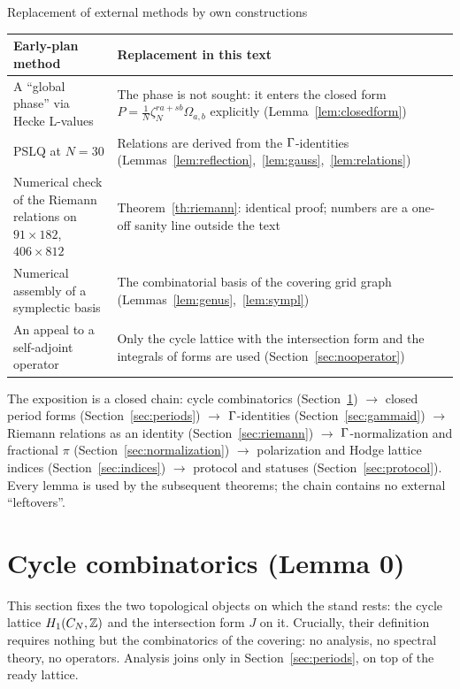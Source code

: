 \begin{keybox}{Replacement of external methods by own constructions}
\begin{center}
\small
\begin{tabularx}{\textwidth}{@{}>{\raggedright\arraybackslash}p{} >{\raggedright\arraybackslash}X@{}}
\toprule
\textbf{Early-plan method} & \textbf{Replacement in this text} \\
\midrule
A ``global phase'' via Hecke L-values &
The phase is not sought: it enters the closed form
$P=\tfrac1N\zeta_N^{ra+sb}\Omega_{a,b}$ explicitly
(Lemma~\ref{lem:closedform}) \\
PSLQ at $N=30$ &
Relations are derived from the $\Gamma$-identities
(Lemmas~\ref{lem:reflection},~\ref{lem:gauss},~\ref{lem:relations}) \\
Numerical check of the Riemann relations on $91\times182$,
$406\times812$ &
Theorem~\ref{th:riemann}: identical proof; numbers are a one-off
sanity line outside the text \\
Numerical assembly of a symplectic basis &
The combinatorial basis of the covering grid graph
(Lemmas~\ref{lem:genus},~\ref{lem:sympl}) \\
An appeal to a self-adjoint operator &
Only the cycle lattice with the intersection form and the integrals
of forms are used (Section~\ref{sec:nooperator}) \\
\bottomrule
\end{tabularx}
\end{center}
\end{keybox}

The exposition is a closed chain: cycle combinatorics
(Section~\ref{sec:cycles}) $\to$ closed period forms
(Section~\ref{sec:periods}) $\to$ $\Gamma$-identities
(Section~\ref{sec:gammaid}) $\to$ Riemann relations as an identity
(Section~\ref{sec:riemann}) $\to$ $\Gamma$-normalization and fractional
$\pi$ (Section~\ref{sec:normalization}) $\to$ polarization and Hodge
lattice indices (Section~\ref{sec:indices}) $\to$ protocol and
statuses (Section~\ref{sec:protocol}). Every lemma is used by the
subsequent theorems; the chain contains no external ``leftovers''.

\section{Cycle combinatorics (Lemma 0)}\label{sec:cycles}

This section fixes the two topological objects on which the stand
rests: the cycle lattice $H_1(C_N,\mathbb{Z})$ and the intersection form
$J$ on it. Crucially, their definition requires nothing but the
combinatorics of the covering: no analysis, no spectral theory, no
operators. Analysis joins only in Section~\ref{sec:periods}, on top
of the ready lattice.

